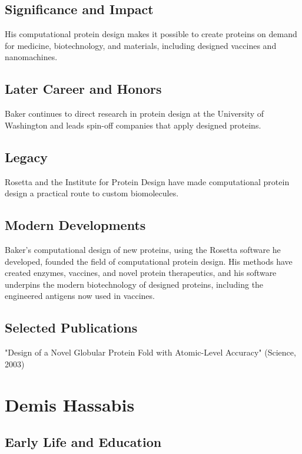 \subsection*{Significance and Impact}

His computational protein design makes it possible to create proteins on demand for medicine, biotechnology, and materials, including designed vaccines and nanomachines.

\subsection*{Later Career and Honors}

Baker continues to direct research in protein design at the University of Washington and leads spin-off companies that apply designed proteins.

\subsection*{Legacy}

Rosetta and the Institute for Protein Design have made computational protein design a practical route to custom biomolecules.

\subsection*{Modern Developments}

Baker's computational design of new proteins, using the Rosetta software he developed, founded the field of computational protein design. His methods have created enzymes, vaccines, and novel protein therapeutics, and his software underpins the modern biotechnology of designed proteins, including the engineered antigens now used in vaccines.

\subsection*{Selected Publications}

"Design of a Novel Globular Protein Fold with Atomic-Level Accuracy" (Science, 2003)

\clearpage

\section{Demis Hassabis}

\subsection*{Early Life and Education}

